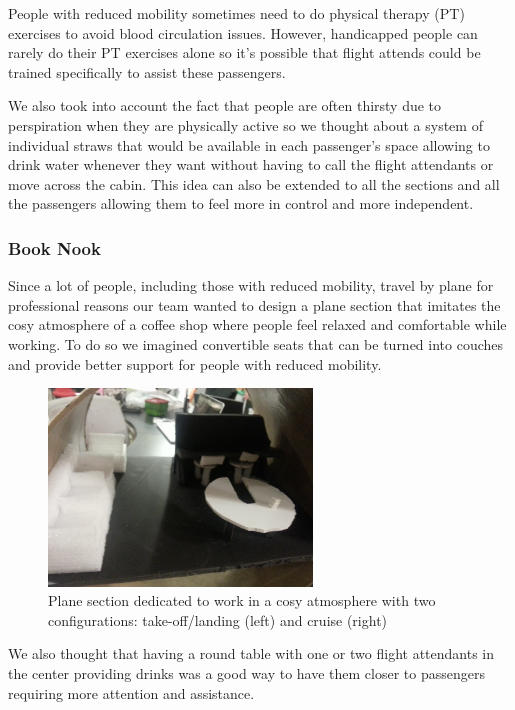 People with reduced mobility sometimes need to do physical therapy (PT) exercises to avoid blood circulation issues. However, handicapped people can rarely do their PT exercises alone so it’s possible that flight attends could be trained specifically to assist these passengers.

We also took into account the fact that people are often thirsty due to perspiration when they are physically active so we thought about a system of individual straws that would be available in each passenger’s space allowing to drink water whenever they want without having to call the flight attendants or move across the cabin. This idea can also be extended to all the sections and all the passengers allowing them to feel more in control and more independent.

\subsubsection{Book Nook}
Since a lot of people, including those with reduced mobility, travel by plane for professional reasons our team wanted to design a plane section that imitates the cosy atmosphere of a coffee shop where people feel relaxed and comfortable while working.
To do so we imagined convertible seats that can be turned into couches and provide better support for people with reduced mobility. 

\begin{figure}[h]
  \centering
     \includegraphics[width=7cm]{images/20140116_172928.jpg}
   \caption{Plane section dedicated to work in a cosy atmosphere with two configurations: take-off/landing (left) and cruise (right)}
  \label{fig:20140116_172928}
\end{figure}

We also thought that having a round table with one or two flight attendants in the center providing drinks was a good way to have them closer to passengers requiring more attention and assistance.

